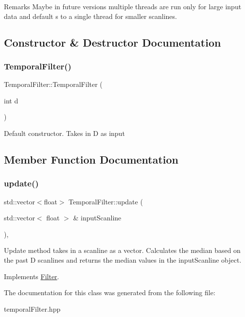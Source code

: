\begin{DoxyRemark}{Remarks}
Maybe in future versions multiple threads are run only for large input data and default s to a single thread for smaller scanlines. 
\end{DoxyRemark}


\subsection{Constructor \& Destructor Documentation}
\mbox{\label{class_temporal_filter_a251e59cf00b8978af4bdb662573ba7f5}} 
\subsubsection{\texorpdfstring{Temporal\+Filter()}{TemporalFilter()}}
{\footnotesize\ttfamily Temporal\+Filter\+::\+Temporal\+Filter (\begin{DoxyParamCaption}\item[{int}]{d }\end{DoxyParamCaption})\hspace{0.3cm}{\ttfamily [inline]}}

Default constructor. Takes in D as input 

\subsection{Member Function Documentation}
\mbox{\label{class_temporal_filter_ae08295aa926fa2bdfc64a5836cc0ac3a}} 
\subsubsection{\texorpdfstring{update()}{update()}}
{\footnotesize\ttfamily std\+::vector$<$float$>$ Temporal\+Filter\+::update (\begin{DoxyParamCaption}\item[{std\+::vector$<$ float $>$ \&}]{input\+Scanline }\end{DoxyParamCaption})\hspace{0.3cm}{\ttfamily [inline]}, {\ttfamily [virtual]}}

Update method takes in a scanline as a vector. Calculates the median based on the past D scanlines and returns the median values in the input\+Scanline object. 

Implements \hyperlink{class_filter}{Filter}.



The documentation for this class was generated from the following file\+:\begin{DoxyCompactItemize}
\item 
temporal\+Filter.\+hpp\end{DoxyCompactItemize}
